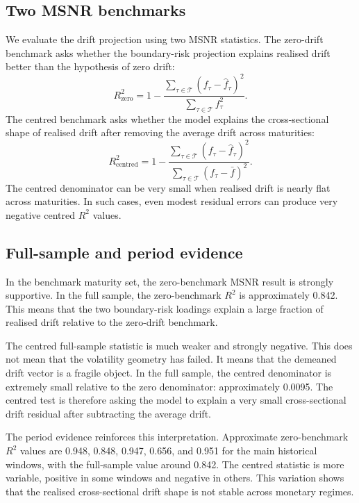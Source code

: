 \documentclass[11pt]{article}
\newcommand{\Rzero}{R^2_{\mathrm{zero}}}
\newcommand{\Rcent}{R^2_{\mathrm{centred}}}
\newcommand{\Tset}{\mathcal{T}}
\begin{document}
\subsection{Two MSNR benchmarks}

We evaluate the drift projection using two MSNR statistics. The zero-drift benchmark asks whether the boundary-risk projection explains realised drift better than the hypothesis of zero drift:
\begin{equation}
  \Rzero
  =1-\frac{\sum_{\tau\in\Tset}(f_\tau-\hat f_\tau)^2}{\sum_{\tau\in\Tset}f_\tau^2}.
\end{equation}
The centred benchmark asks whether the model explains the cross-sectional shape of realised drift after removing the average drift across maturities:
\begin{equation}
  \Rcent
  =1-\frac{\sum_{\tau\in\Tset}(f_\tau-\hat f_\tau)^2}{\sum_{\tau\in\Tset}(f_\tau-\bar f)^2}.
\end{equation}
The centred denominator can be very small when realised drift is nearly flat across maturities. In such cases, even modest residual errors can produce very negative centred $R^2$ values.

\subsection{Full-sample and period evidence}

In the benchmark maturity set, the zero-benchmark MSNR result is strongly supportive. In the full sample, the zero-benchmark $R^2$ is approximately 0.842. This means that the two boundary-risk loadings explain a large fraction of realised drift relative to the zero-drift benchmark.

The centred full-sample statistic is much weaker and strongly negative. This does not mean that the volatility geometry has failed. It means that the demeaned drift vector is a fragile object. In the full sample, the centred denominator is extremely small relative to the zero denominator: approximately 0.0095. The centred test is therefore asking the model to explain a very small cross-sectional drift residual after subtracting the average drift.

The period evidence reinforces this interpretation. Approximate zero-benchmark $R^2$ values are 0.948, 0.848, 0.947, 0.656, and 0.951 for the main historical windows, with the full-sample value around 0.842. The centred statistic is more variable, positive in some windows and negative in others. This variation shows that the realised cross-sectional drift shape is not stable across monetary regimes.
\end{document}

